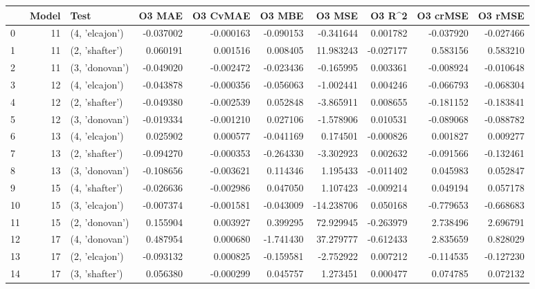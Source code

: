 \begin{tabular}{lrlrrrrrrr}
\toprule
{} &  Model &            Test &    O3 MAE &  O3 CvMAE &    O3 MBE &     O3 MSE &    O3 R\textasciicircum2 &  O3 crMSE &   O3 rMSE \\
\midrule
0  &     11 &  (4, 'elcajon') & -0.037002 & -0.000163 & -0.090153 &  -0.341644 &  0.001782 & -0.037920 & -0.027466 \\
1  &     11 &  (2, 'shafter') &  0.060191 &  0.001516 &  0.008405 &  11.983243 & -0.027177 &  0.583156 &  0.583210 \\
2  &     11 &  (3, 'donovan') & -0.049020 & -0.002472 & -0.023436 &  -0.165995 &  0.003361 & -0.008924 & -0.010648 \\
3  &     12 &  (4, 'elcajon') & -0.043878 & -0.000356 & -0.056063 &  -1.002441 &  0.004246 & -0.066793 & -0.068304 \\
4  &     12 &  (2, 'shafter') & -0.049380 & -0.002539 &  0.052848 &  -3.865911 &  0.008655 & -0.181152 & -0.183841 \\
5  &     12 &  (3, 'donovan') & -0.019334 & -0.001210 &  0.027106 &  -1.578906 &  0.010531 & -0.089068 & -0.088782 \\
6  &     13 &  (4, 'elcajon') &  0.025902 &  0.000577 & -0.041169 &   0.174501 & -0.000826 &  0.001827 &  0.009277 \\
7  &     13 &  (2, 'shafter') & -0.094270 & -0.000353 & -0.264330 &  -3.302923 &  0.002632 & -0.091566 & -0.132461 \\
8  &     13 &  (3, 'donovan') & -0.108656 & -0.003621 &  0.114346 &   1.195433 & -0.011402 &  0.045983 &  0.052847 \\
9  &     15 &  (4, 'shafter') & -0.026636 & -0.002986 &  0.047050 &   1.107423 & -0.009214 &  0.049194 &  0.057178 \\
10 &     15 &  (3, 'elcajon') & -0.007374 & -0.001581 & -0.043009 & -14.238706 &  0.050168 & -0.779653 & -0.668683 \\
11 &     15 &  (2, 'donovan') &  0.155904 &  0.003927 &  0.399295 &  72.929945 & -0.263979 &  2.738496 &  2.696791 \\
12 &     17 &  (4, 'donovan') &  0.487954 &  0.000680 & -1.741430 &  37.279777 & -0.612433 &  2.835659 &  0.828029 \\
13 &     17 &  (2, 'elcajon') & -0.093132 &  0.000825 & -0.159581 &  -2.752922 &  0.007212 & -0.114535 & -0.127230 \\
14 &     17 &  (3, 'shafter') &  0.056380 & -0.000299 &  0.045757 &   1.273451 &  0.000477 &  0.074785 &  0.072132 \\

\end{tabular}
